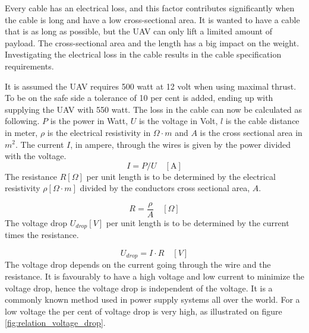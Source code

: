 \noindent
Every cable has an electrical loss, and this factor contributes significantly when the cable is long and have a low cross-sectional area. It is wanted to have a cable that is as long as possible, but the UAV can only lift a limited amount of payload. The cross-sectional area and the length has a big impact on the weight. Investigating the electrical loss in the cable results in the cable specification requirements. 
 
\noindent
It is assumed the UAV requires 500 watt at 12 volt when using maximal thrust. To be on the safe side a tolerance of 10 per cent is added, ending up with supplying the UAV with 550 watt. 
The loss in the cable can now be calculated as following. 
$P$ is the power in Watt, $U$ is the voltage in Volt, $l$ is the cable distance in meter, $\rho$ is the electrical resistivity in $\Omega \cdot m$ and $A$ is the cross sectional area in $m^2$.
\noindent
The current $I$, in ampere, through the wires is given by the power divided with the voltage.
\begin{equation}
I = P/U \quad [\mathrm{A}]
\end{equation}
\noindent
The resistance $R[\Omega]$ per unit length is to be determined by the electrical resistivity $\rho [\Omega \cdot m]$ divided by the conductors cross sectional area, $A$.

\begin{equation}
R = \frac{\rho}{A}\quad [\Omega]
\end{equation}
\noindent
The voltage drop $U_{drop}[V]$ per unit length is to be determined by  the current times the resistance.

\begin{equation}
U_{drop} = I \cdot R \quad [V]
\end{equation}
\noindent
The voltage drop depends on the current going through the wire and the resistance. It is favourably to have a high voltage and low current to minimize the voltage drop, hence the voltage drop is independent of the voltage. It is a commonly known method used in power supply systems all over the world. For a low voltage the per cent of voltage drop is very high, as illustrated on figure \ref{fig:relation_voltage_drop}.

